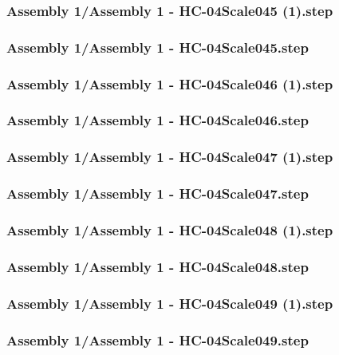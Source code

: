 \documentclass[a4paper,12pt]{article}
\begin{document}
\subsubsection{Assembly 1/Assembly 1 - HC-04Scale045 (1).step}

\subsubsection{Assembly 1/Assembly 1 - HC-04Scale045.step}

\subsubsection{Assembly 1/Assembly 1 - HC-04Scale046 (1).step}

\subsubsection{Assembly 1/Assembly 1 - HC-04Scale046.step}

\subsubsection{Assembly 1/Assembly 1 - HC-04Scale047 (1).step}

\subsubsection{Assembly 1/Assembly 1 - HC-04Scale047.step}

\subsubsection{Assembly 1/Assembly 1 - HC-04Scale048 (1).step}

\subsubsection{Assembly 1/Assembly 1 - HC-04Scale048.step}

\subsubsection{Assembly 1/Assembly 1 - HC-04Scale049 (1).step}

\subsubsection{Assembly 1/Assembly 1 - HC-04Scale049.step}

\end{document}
